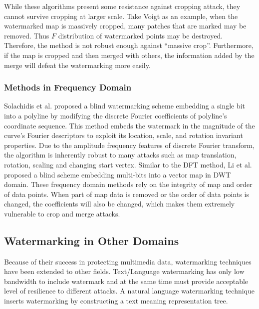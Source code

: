 While these algorithms present some resistance against cropping attack, 
they cannot survive cropping at larger scale.
Take Voigt\cite{Vogit:2003} as an example, when the watermarked map is 
massively cropped, many patches that are marked may be
removed. Thus $F$ distribution of watermarked points may be destroyed. 
Therefore, the method is not robust enough against ``massive crop''. 
Furthermore, if the map is cropped and then merged with others, 
the information added by the merge will defeat the watermarking more easily.

\subsubsection{Methods in Frequency Domain}
 
Solachidis et al.\cite{DFT} proposed a blind watermarking scheme embedding 
a single bit into a polyline by modifying the discrete Fourier coefficients 
of polyline’s coordinate sequence.  This method embeds the watermark in 
the magnitude of the curve’s Fourier descriptors to exploit 
its location, scale, and rotation invariant properties. Due to the amplitude frequency 
features of discrete Fourier transform, the algorithm is inherently robust to many attacks 
such as map translation, rotation, scaling and changing start vertex. Similar to the DFT 
method\cite{DFT}, Li et al. proposed a blind scheme \cite{Liyuanyuan03} embedding 
multi-bits into a vector map in DWT domain. 
These frequency domain methods rely on the integrity
of map and order of data points. When part of map data is removed or the order 
of data points is changed, the coefficients will 
also be changed, which makes them extremely vulnerable to crop 
and merge attacks.


\subsection{Watermarking in Other Domains}
Because of their success in protecting multimedia data, 
watermarking techniques have been extended to other
fields. Text/Language watermarking has only low bandwidth to include watermark 
and at the same time must provide acceptable level of resilience to different attacks. 
A natural language watermarking technique \cite{NLW} inserts watermarking by 
constructing a text meaning representation tree.

